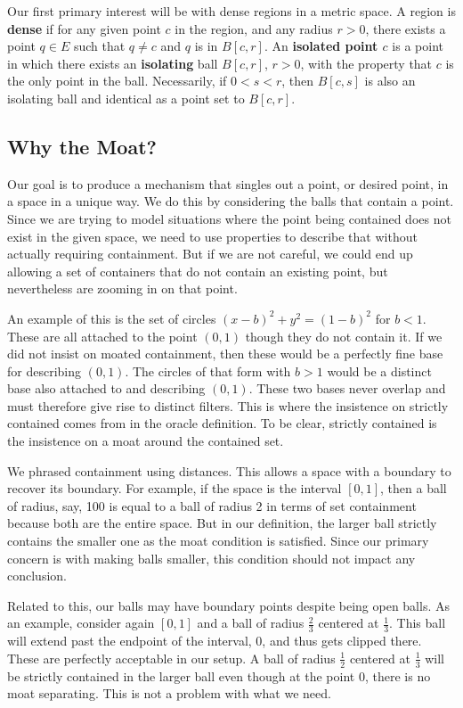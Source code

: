 \documentclass[12pt]{article}
\begin{document}
Our first primary interest will be with dense regions in a metric space. A region is \textbf{dense} if for any given point $c$ in the region, and any radius $r>0$, there exists a point $q \in E$ such that $q \neq c$ and $q$ is in $B[c,r]$. An \textbf{isolated point $c$} is a point in which there exists an \textbf{isolating} ball $B[c, r]$, $r > 0$, with the property that $c$ is the only point in the ball. Necessarily, if $0 < s < r$, then $B[c, s]$ is also an isolating ball and identical as a point set to $B[c,r]$. 

\subsection{Why the Moat?}

Our goal is to produce a mechanism that singles out a point, or desired point, in a space in a unique way. We do this by considering the balls that contain a point. Since we are trying to model situations where the point being contained does not exist in the given space, we need to use properties to describe that without actually requiring containment. But if we are not careful, we could end up allowing a set of containers that do not contain an existing point, but nevertheless are zooming in on that point. 

An example of this is the set of circles $(x-b)^2 + y^2 = (1-b)^2$ for $b < 1$. These are all attached to the point $(0,1)$ though they do not contain it. If we did not insist on moated containment, then these would be a perfectly fine base for describing $(0,1)$. The circles of that form with $b > 1$ would be a distinct base also attached to and describing $(0,1)$. These two bases never overlap and must therefore give rise to distinct filters. This is where the insistence on strictly contained comes from in the oracle definition. To be clear, strictly contained is the insistence on a moat around the contained set. 

We phrased containment using distances. This allows a space with a boundary to recover its boundary. For example, if the space is  the interval $[0, 1]$, then a ball of radius, say, 100 is equal to a ball of radius 2 in terms of set containment because both are the entire space. But in our definition, the larger ball strictly contains the smaller one as the moat condition is satisfied. Since our primary concern is with making balls smaller, this condition should not impact any conclusion. 

Related to this, our balls may have boundary points despite being open balls. As an example, consider again $[0,1]$ and a ball of radius $\frac{2}{3}$ centered at $\frac{1}{3}$. This ball will extend past the endpoint of the interval, $0$, and thus gets clipped there. These are perfectly acceptable in our setup. A ball of radius $\frac{1}{2}$ centered at $\frac{1}{3}$ will be strictly contained in the larger ball even though at the point $0$, there is no moat separating. This is not a problem with what we need. 
\end{document}
